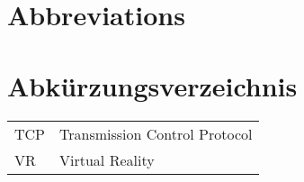 \ifmmtlanguageenglish
\section*{Abbreviations}
\else
\section*{Abkürzungsverzeichnis}
\fi

\begin{table}[h]		
	\begin{tabular}{ll}
		TCP & Transmission Control Protocol \\
		VR & Virtual Reality \\			
	\end{tabular}
\end{table}
